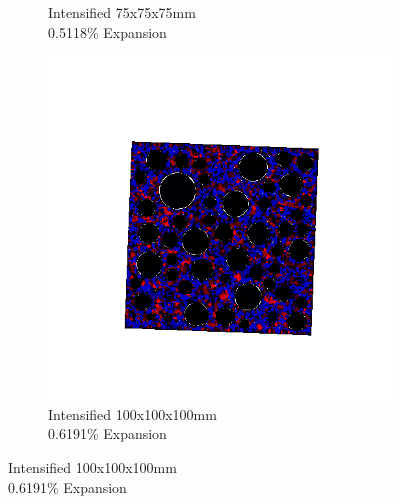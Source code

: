 \begin{figure}[ht!]
\begin{subfigure}{.3\textwidth}
    \caption{Intensified 75x75x75mm  \\ 0.5118\% Expansion}
    \end{subfigure}
    \begin{subfigure}{.3\textwidth}
      \centering
      \includegraphics[width=.9\linewidth]{Files/exp_3D/DEF/A30X-1C_3_stress.png}
    \caption{Intensified 100x100x100mm \\  0.6191\% Expansion}
    \end{subfigure}%


\end{figure}
